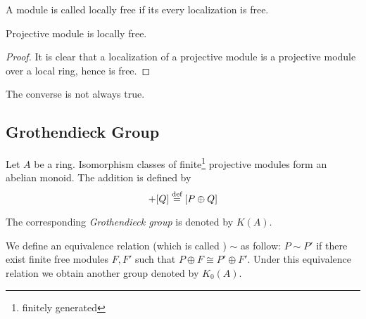   \begin{defn}
    A module is called locally free if its every localization is free.
  \end{defn}
  \begin{cor}
    Projective module is locally free.
  \end{cor}
  \begin{proof}
    It is clear that a localization of a projective module is a projective module over a local ring, hence is free.
  \end{proof}
  \begin{warn}
    The converse is not always true.
  \end{warn}



\subsection{Grothendieck Group}
  Let $A$ be a ring. Isomorphism classes of finite\footnote{finitely generated} projective modules form an abelian monoid. The addition is defined by
  \begin{equation*}
    [P]+[Q]\defeq[P\oplus Q]
  \end{equation*}

  The corresponding \emph{Grothendieck group} is denoted by $K(A)$.

  We define an equivalence relation (which is called ) $\sim$ as follow: $P\sim P'$ if there exist finite free modules $F,F'$ such that $P\oplus F\cong P'\oplus F'$. Under this equivalence relation we obtain another group denoted by $K_0(A)$.

